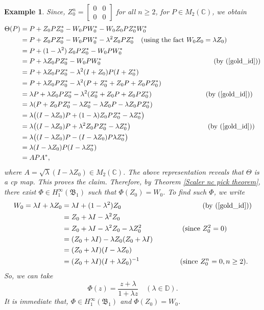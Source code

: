 \documentclass[12pt]{amsart}%
\newtheorem{example}[theorem]{Example}
\numberwithin{equation}{section}
\newcommand{\fB}{{\mathfrak{B}}}
\newcommand{\D}{\mathbb{D}}
\newcommand{\C}{\mathbb{C}}
\begin{document}
\begin{example}
Since, $Z^n_0= \begin{bmatrix}0&0\\0 &0\end{bmatrix}$ for all $n\geq 2$, for $P\in M_2(\C)$, we obtain
\allowdisplaybreaks
\begingroup
\begin{align*}
\Theta(P)& =P+ Z_0P Z^*_0- W_0 P W^*_0 -W_0 Z_0 P Z^*_0 W^*_0 \\
&= P + Z_0 P Z_0^* - W_0 P W_0^* - \lambda^2 Z_0 P Z_0^* \quad(\text{using the fact } W_0 Z_0=\lambda Z_0)\\
 & = P + (1-\lambda^2)\, Z_0 P Z_0^* - W_0PW_0^*\\
  &= P + \lambda Z_0 P Z_0^* - W_0 P W_0^* \hspace{5.8cm}(\text{by }(\ref{gold_id}))\\
  &=  P + \lambda Z_0 P Z_0^* - \lambda^2(I+Z_0) P (I+Z_0^*)\\
  &= P + \lambda Z_0 P Z_0^* - \lambda^2(P+Z_0^*+Z_0P+Z_0PZ_0^*)\\
  &= \lambda P + \lambda Z_0 P Z_0^* -\lambda^2(Z_0^*+Z_0P+Z_0PZ_0^*)\hspace{2.8cm}(\text{by }(\ref{gold_id}))\\
  &= \lambda (P +  Z_0 P Z_0^* -\lambda Z_0^*-\lambda Z_0P-\lambda Z_0PZ_0^*)\\
  &= \lambda \big((I-\lambda Z_0)P +  (1-\lambda) Z_0 P Z_0^* -\lambda Z_0^*\big)\\
  &=\lambda \big((I-\lambda Z_0)P +  \lambda^2 Z_0 P Z_0^* -\lambda Z_0^*\big)\hspace{4cm}(\text{by }(\ref{gold_id}))\\
&=\lambda \big((I-\lambda Z_0)P -  (I-\lambda Z_0)P\lambda Z_0^*\big)\\
&=\lambda (I-\lambda Z_0)P(I-\lambda Z_0^*)\\
&=APA^*,
  \end{align*}
  \endgroup
where $A=\sqrt{\lambda}(I-\lambda Z_0)\in M_2(\C)$. The above representation reveals that $\Theta$ is a \textit{cp} map. This proves the claim. Therefore, by Theorem \ref{Scaler nc pick theorem}, there exist $\Phi\in H^\infty_1(\fB_1)$ such that $\Phi(Z_0)=W_0$. To find such $\Phi$, we write
\allowdisplaybreaks
\begingroup
\begin{align*}
W_0=\lambda I +\lambda Z_0 & = \lambda I+(1-\lambda^2)Z_0\hspace{4cm}(\text{by }(\ref{gold_id}))\\
& = Z_0 +\lambda I -\lambda^2 Z_0\\
& = Z_0 +\lambda I -\lambda^2 Z_0-\lambda Z_0^2\hspace{2cm}(\text{since }Z_0^2=0)\\
& =(Z_0 +\lambda I)- \lambda Z_0(Z_0+\lambda I)\\
&= (Z_0 +\lambda I)(I-\lambda Z_0)\\
& =(Z_0+\lambda I)(I+\lambda Z_0)^{-1}\hspace{2cm} (\text{since }Z_0^n=0, n\geq 2).
\end{align*}
\endgroup
So, we can take 
\[
\Phi(z)=\frac{z+\lambda}{1+ \lambda z} \quad (\lambda\in \D).
\]
It is immediate that, $\Phi\in H^\infty_1(\fB_1)$ and $\Phi(Z_0)=W_0$.
\end{example}
\end{document}
